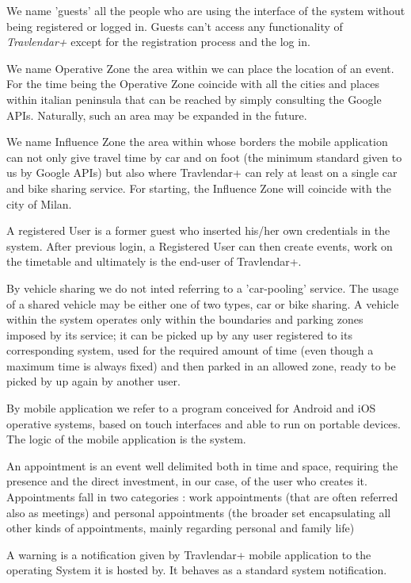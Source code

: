 \begin{description}
				\item[Guest] We name 'guests' all the people who are using the interface of the system without being registered or logged in. Guests can't access any functionality of \textit{Travlendar+} except for the registration process and the log in. 
				\item[Operative Zone] We name Operative Zone the area within we can place the location of an event. For the time being the Operative Zone coincide with all the cities and places within italian peninsula that can be reached by simply consulting the Google APIs. Naturally, such an area may be expanded in the future.
				\item[Influence Zone] We name Influence Zone the area within whose borders the mobile application can not only give travel time by car and on foot (the minimum standard given to us by Google APIs) but also where Travlendar+ can rely at least on a single car and bike sharing service. For starting, the Influence Zone will coincide with the city of Milan.
				\item
				\item[Registered User] A registered User is a former guest who inserted his/her own credentials in the system. After previous login, a Registered User can then create events, work on the timetable and ultimately is the end-user of Travlendar+.
				\item[Timetable]
				\item[Vehicle Sharing System and a Shared Vehicle] By vehicle sharing we do not inted referring to a 'car-pooling' service. The usage of a shared vehicle may be either one of two types, car or bike sharing. A vehicle within the system operates only within the boundaries and parking zones imposed by its service; it can be picked up by any user registered to its corresponding system, used for the required amount of time (even though a maximum time is always fixed) and then parked in an allowed zone, ready to be picked by up again by another user. 				
				\item[Mobile Application] By mobile application we refer to a program conceived for Android and iOS operative systems, based on touch interfaces and able to run on portable devices. The logic of the mobile application is the system.
				\item[Appointment] An appointment is an event well delimited both in time and space, requiring the presence and the direct investment, in our case, of the user who creates it. Appointments fall in two categories : work appointments (that are often referred also as meetings) and personal appointments (the broader set encapsulating all other kinds of appointments, mainly regarding personal and family life)
				\item[Warning] A warning is a notification given by Travlendar+ mobile application to the operating System it is hosted by. It behaves as a standard system notification.
\end{description}
